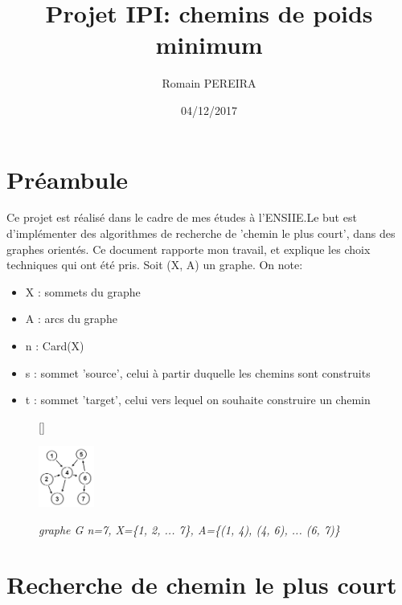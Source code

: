 \documentclass[10pt]{article}
\title{Projet IPI: chemins de poids minimum}
\author{Romain PEREIRA}
\date{04/12/2017}
\begin{document}
	\maketitle
	\tableofcontents

	\section*{Préambule}

		Ce projet est réalisé dans le cadre de mes études à l'ENSIIE.\newline Le but est d'implémenter des
		algorithmes de recherche de 'chemin le plus court', dans des graphes orientés.
		Ce document rapporte mon travail, et explique les choix techniques qui ont été pris.
		Soit (X, A) un graphe. On note:
		\begin{itemize}[label=-]
			\setlength\itemsep{0.1em}
			\item X : sommets du graphe
			\item A : arcs du graphe
			\item n : Card(X)
			\item s : sommet 'source', celui à partir duquelle les chemins sont construits
			\item t : sommet 'target', celui vers lequel on souhaite construire un chemin
		\end{itemize}

		\begin{figure}
			[\FBwidth]
			{\caption{\textit{\newline graphe G n=7, \newline X=\{1, 2, ... 7\}, \newline A=\{(1, 4), (4, 6), ... (6, 7)\}}}
			\label{fig:test}}
			{\includegraphics[height=2cm]{./images/graph.png}}
		\end{figure}

	\newpage
	\section{Recherche de chemin le plus court}
\end{document}
